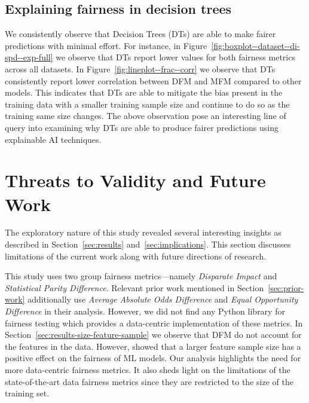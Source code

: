 \documentclass[conference,review,anonymous]{IEEEtran}
\begin{document}
\subsection{Explaining fairness in decision trees}\label{sec:discuss-explain-fair-dt}


We consistently observe that Decision Trees (DTs) are able to make
fairer predictions with minimal effort. For instance, in
Figure \ref{fig:boxplot--dataset--di-spd--exp-full} we observe that
DTs report lower values for both fairness metrics across all
datasets. In Figure \ref{fig:lineplot--frac--corr} we observe that DTs
consistently report lower correlation between DFM and MFM compared to
other models. This indicates that DTs are able to mitigate the bias
present in the training data with a smaller training sample size and
continue to do so as the training same size changes. The above
observation pose an interesting line of query into examining why DTs
are able to produce fairer predictions using explainable AI
techniques.

\section{Threats to Validity and Future Work}\label{sec:threats}
The exploratory nature of this study revealed several interesting
insights as described in Section \ref{sec:results}
and \ref{sec:implications}. This section discusses limitations of the
current work along with future directions of research.



This study uses two group fairness metrics---namely \emph{Disparate
Impact} and \emph{Statistical Parity Difference}. Relevant prior work
mentioned in Section \ref{sec:prior-work} additionally use
\emph{Average Absolute Odds Difference} and \emph{Equal Opportunity
Difference} in their analysis. However, we did not find any Python
library for fairness testing which provides a data-centric
implementation of these metrics. In
Section \ref{sec:results-size-feature-sample} we observe that DFM do
not account for the features in the data. However,
\cite{zhang2021ignorance} showed that a larger feature sample
size has a positive effect on the fairness of ML models. Our analysis
highlights the need for more data-centric fairness metrics. It also
sheds light on the limitations of the state-of-the-art data fairness
metrics since they are restricted to the size of the training set.
\end{document}
